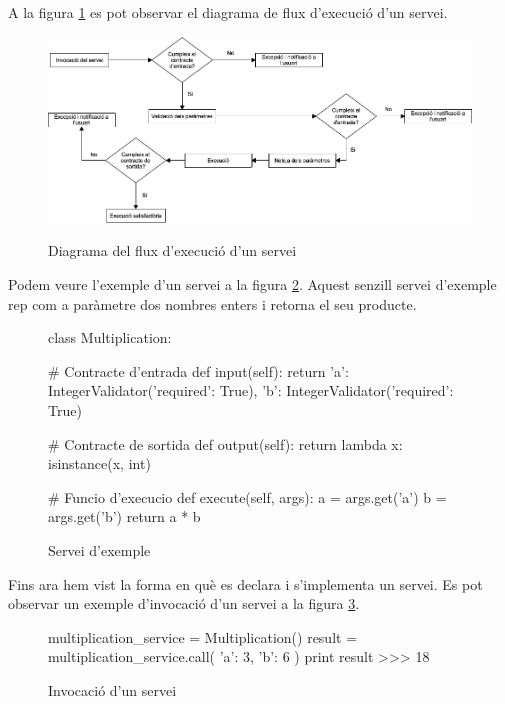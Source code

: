 	A la figura \ref{fig:fluxe} es pot observar el diagrama de flux d'execució d'un servei. 
	
	\begin{figure}[h!]
		\includegraphics[scale=0.35]{img/flux.png}
		\label{fig:fluxe}
		\caption{Diagrama del flux d'execució d'un servei}
	\end{figure}
	
	Podem veure l'exemple d'un servei a la figura \ref{fig:ex_servei}. Aquest senzill servei d'exemple rep com a paràmetre dos nombres enters i retorna el seu producte. 
	
	\begin{figure}[h!]
		\begin{python}
class Multiplication:
	
	# Contracte d'entrada
	def input(self):
		return {
			'a': IntegerValidator({'required': True}),
			'b': IntegerValidator({'required': True})
		}
	
	# Contracte de sortida
	def output(self):
		return lambda x: isinstance(x, int)
		
	# Funcio d'execucio
	def execute(self, args):
		a = args.get('a')
		b = args.get('b')
		return a * b
		\end{python}
		\caption{Servei d'exemple}
		\label{fig:ex_servei}
	\end{figure}
	
	Fins ara hem vist la forma en què es declara i s'implementa un servei. Es pot observar un exemple d'invocació d'un servei a la figura \ref{fig:invocacio_servei}. \\
	
		\begin{figure}[h!]
		\begin{python}
multiplication_service = Multiplication()
result = multiplication_service.call({
	'a': 3,
	'b': 6
})
print result
>>> 18
		\end{python}
		\caption{Invocació d'un servei}
		\label{fig:invocacio_servei}
	\end{figure}
	
